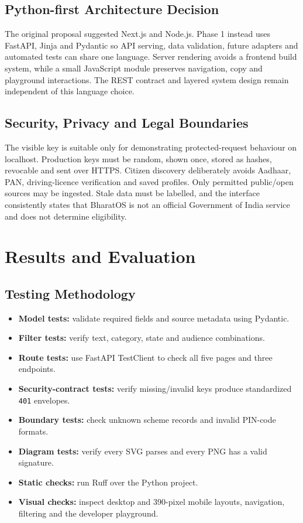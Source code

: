 \documentclass{tietreport}
\begin{document}
\section{Python-first Architecture Decision}
The original proposal suggested Next.js and Node.js. Phase 1 instead uses FastAPI, Jinja and
Pydantic so API serving, data validation, future adapters and automated tests can share one
language. Server rendering avoids a frontend build system, while a small JavaScript module
preserves navigation, copy and playground interactions. The REST contract and layered system
design remain independent of this language choice.

\section{Security, Privacy and Legal Boundaries}
The visible key is suitable only for demonstrating protected-request behaviour on localhost.
Production keys must be random, shown once, stored as hashes, revocable and sent over HTTPS.
Citizen discovery deliberately avoids Aadhaar, PAN, driving-licence verification and saved
profiles. Only permitted public/open sources may be ingested. Stale data must be labelled, and
the interface consistently states that BharatOS is not an official Government of India service
and does not determine eligibility.

\chapter{Results and Evaluation}

\section{Testing Methodology}
\begin{itemize}
  \item \textbf{Model tests:} validate required fields and source metadata using Pydantic.
  \item \textbf{Filter tests:} verify text, category, state and audience combinations.
  \item \textbf{Route tests:} use FastAPI TestClient to check all five pages and three endpoints.
  \item \textbf{Security-contract tests:} verify missing/invalid keys produce standardized
        \texttt{401} envelopes.
  \item \textbf{Boundary tests:} check unknown scheme records and invalid PIN-code formats.
  \item \textbf{Diagram tests:} verify every SVG parses and every PNG has a valid signature.
  \item \textbf{Static checks:} run Ruff over the Python project.
  \item \textbf{Visual checks:} inspect desktop and 390-pixel mobile layouts, navigation,
        filtering and the developer playground.
\end{itemize}
\end{document}
